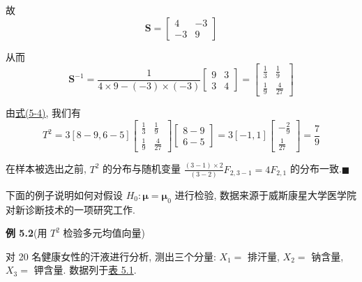 故
\[
\mathbf{S}=\begin{bmatrix}4&-3\\-3&9\end{bmatrix}
\]

从而
\[
\mathbf{S}^{-1}=\frac{1}{4\times 9-(-3)\times(-3)}\begin{bmatrix}9&3\\3&4\end{bmatrix}=\begin{bmatrix}\frac{1}{3}&\frac{1}{9}\\[2pt]\frac{1}{9}&\frac{4}{27}\end{bmatrix}
\]

由\hyperref[eq:5-4]{式(5-4)}, 我们有
\[
T^2=3[8-9,6-5]\begin{bmatrix}\frac{1}{3}&\frac{1}{9}\\[2pt]\frac{1}{9}&\frac{4}{27}\end{bmatrix}\begin{bmatrix}8-9\\6-5\end{bmatrix}=3[-1,1]\begin{bmatrix}-\frac{2}{9}\\[2pt]\frac{1}{27}\end{bmatrix}=\frac{7}{9}
\]

在样本被选出之前, $T^2$ 的分布与随机变量 $\frac{(3-1)\times 2}{(3-2)}F_{2,3-1}=4F_{2,1}$ 的分布一致.\hfill$\blacksquare$

下面的例子说明如何对假设 $H_0: \boldsymbol{\mu}=\boldsymbol{\mu}_0$ 进行检验, 数据来源于威斯康星大学医学院对新诊断技术的一项研究工作.

\noindent\textbf{例 5.2}\quad (用 $T^2$ 检验多元均值向量)

对 20 名健康女性的汗液进行分析, 测出三个分量: $X_1=$ 排汗量, $X_2=$ 钠含量, $X_3=$ 钾含量. 数据列于\hyperref[tab:5.1]{表 5.1}.

